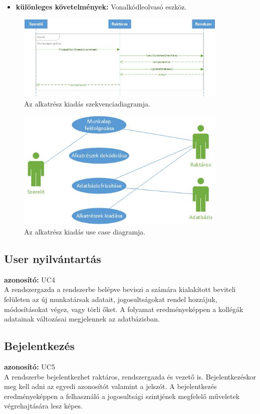 \documentclass[12pt]{article}\usepackage[left=20mm,right=20mm,top=15mm,bottom=20mm]{geometry}
\begin{document}
\begin{itemize}
\item[] \textbf{különleges követelmények: } Vonalkódleolvasó eszköz.
\end{itemize} 

\begin{figure}[!h]
    \centering
        \includegraphics[width=0.9\textwidth]{figures/alkatresz_kiadas_SD.jpg}
        \caption{Az alkatrész kiadás szekvenciadiagramja.}
\end{figure}

\begin{figure}[!h]
    \centering
        \includegraphics[width=0.9\textwidth]{figures/alkatresz_kiadas_UC.jpg}
        \caption{Az alkatrész kiadás use case diagramja.}
\end{figure}


\FloatBarrier
\subsection{User nyilvántartás}
\textbf{azonosító: } UC4 \\
A rendszergazda a rendszerbe belépve beviszi a számára kialakított beviteli felületen az új munkatársak adatait, jogosultságokat rendel hozzájuk, módosításokat végez, vagy törli őket. 
A folyamat eredményeképpen a kollégák adatainak változásai megjelennek az adatbázisban.

\subsection{Bejelentkezés}
\textbf{azonosító: } UC5 \\
A rendszerbe bejelentkezhet raktáros, rendszergazda és vezető is.
Bejelentkezéskor meg kell adni az egyedi azonosítót valamint a jelszót.
A bejelentkezés eredményeképpen a felhasználó a jogosultsági szintjének megfelelő műveletek végrehajtására lesz képes.
\end{document}
